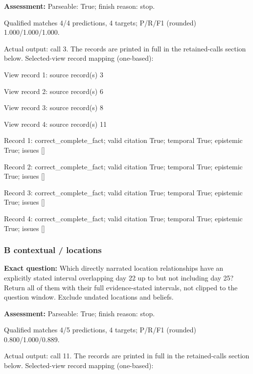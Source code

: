 \noindent\textbf{Assessment:} Parseable: True; finish reason: stop.

Qualified matches 4/4 predictions, 4 targets; P/R/F1 (rounded) 1.000/1.000/1.000.\par

Actual output: call 3. The records are printed in full in the retained-calls section below. Selected-view record mapping (one-based):

View record 1: source record(s) 3\par

View record 2: source record(s) 6\par

View record 3: source record(s) 8\par

View record 4: source record(s) 11\par

Record 1: correct\_complete\_fact; valid citation True; temporal True; epistemic True; issues []\par

Record 2: correct\_complete\_fact; valid citation True; temporal True; epistemic True; issues []\par

Record 3: correct\_complete\_fact; valid citation True; temporal True; epistemic True; issues []\par

Record 4: correct\_complete\_fact; valid citation True; temporal True; epistemic True; issues []\par

\subsubsection*{B contextual / locations}

\noindent\textbf{Exact question:} Which directly narrated location relationships have an explicitly stated interval overlapping day 22 up to but not including day 25? Return all of them with their full evidence-stated intervals, not clipped to the question window. Exclude undated locations and beliefs.\par

\noindent\textbf{Assessment:} Parseable: True; finish reason: stop.

Qualified matches 4/5 predictions, 4 targets; P/R/F1 (rounded) 0.800/1.000/0.889.\par

Actual output: call 11. The records are printed in full in the retained-calls section below. Selected-view record mapping (one-based):

